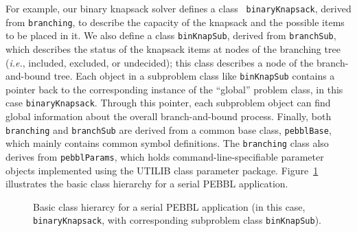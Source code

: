 For example, our binary knapsack solver defines a class {\tt
binaryKnapsack}, derived from \texttt{branching}, to describe the
capacity of the knapsack and the possible items to be placed in it. We
also define a class \texttt{binKnapSub}, derived from
\texttt{branchSub}, which describes the status of the knapsack items
at nodes of the branching tree (\emph{i.e.}, included, excluded, or
undecided); this class describes a node of the branch-and-bound tree.
Each object in a subproblem class like \texttt{binKnapSub} contains a
pointer back to the corresponding instance of the ``global'' problem
class, in this case \texttt{binaryKnapsack}.  Through this pointer,
each subproblem object can find global information about the overall
branch-and-bound process.  Finally, both \texttt{branching} and
\texttt{branchSub} are derived from a common base class,
\texttt{pebblBase}, which mainly contains common symbol
definitions. The \texttt{branching} class also derives from
\texttt{pebblParams}, which holds command-line-specifiable
parameter objects implemented using the UTILIB class parameter
package.  Figure~\ref{fig:globalsub} illustrates the basic class
hierarchy for a serial PEBBL application.

\begin{figure}[tbp]
\begin{center}
\vspace{-0.2in}
\end{center}
\caption{Basic class hierarcy for a serial PEBBL application (in this
case, 
\texttt{binaryKnapsack}, with corresponding subproblem class
\texttt{binKnapSub}).}
\label{fig:globalsub}
\end{figure}

